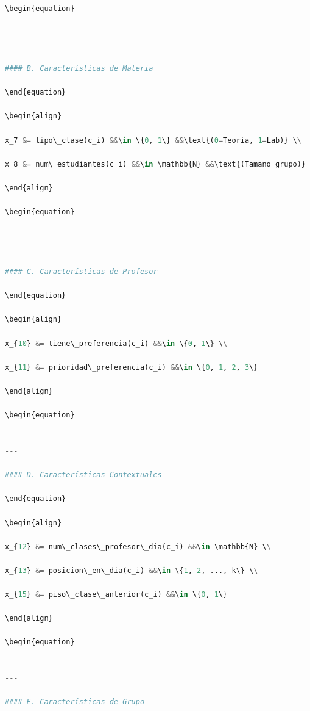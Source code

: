 \begin{itemize}
\begin{itemize}
\begin{itemize}
\begin{itemize}
\begin{itemize}
\begin{itemize}
\begin{enumerate}
\begin{enumerate}
\begin{enumerate}
\begin{enumerate}
\begin{lstlisting}[language=Python]
\begin{equation}


---

#### B. Características de Materia

\end{equation}

\begin{align}

x_7 &= tipo\_clase(c_i) &&\in \{0, 1\} &&\text{(0=Teoria, 1=Lab)} \\

x_8 &= num\_estudiantes(c_i) &&\in \mathbb{N} &&\text{(Tamano grupo)}

\end{align}

\begin{equation}


---

#### C. Características de Profesor

\end{equation}

\begin{align}

x_{10} &= tiene\_preferencia(c_i) &&\in \{0, 1\} \\

x_{11} &= prioridad\_preferencia(c_i) &&\in \{0, 1, 2, 3\}

\end{align}

\begin{equation}


---

#### D. Características Contextuales

\end{equation}

\begin{align}

x_{12} &= num\_clases\_profesor\_dia(c_i) &&\in \mathbb{N} \\

x_{13} &= posicion\_en\_dia(c_i) &&\in \{1, 2, ..., k\} \\

x_{15} &= piso\_clase\_anterior(c_i) &&\in \{0, 1\}

\end{align}

\begin{equation}


---

#### E. Características de Grupo


\end{lstlisting}
\end{enumerate}
\end{enumerate}
\end{enumerate}
\end{enumerate}
\end{itemize}
\end{itemize}
\end{itemize}
\end{itemize}
\end{itemize}
\end{itemize}

